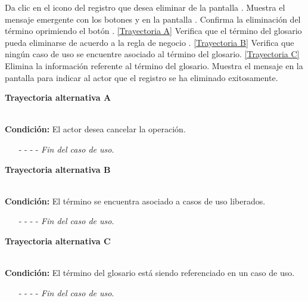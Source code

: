 	\begin{UCtrayectoria}
		\UCpaso[\UCactor] Da clic en el icono \eliminar del registro que desea eliminar de la pantalla .
		\UCpaso[\UCsist] Muestra el mensaje emergente  con los botones  y  en la pantalla .
		\UCpaso[\UCactor] Confirma la eliminación del término oprimiendo el botón . \hyperlink{CU6-3:TAA}{[Trayectoria A]}
		\UCpaso[\UCsist] Verifica que el término del glosario pueda eliminarse de acuerdo a la regla de negocio . \hyperlink{CU6-3:TAB}{[Trayectoria B]}
		\UCpaso[\UCsist] Verifica que ningún caso de uso se encuentre asociado al término del glosario. \hyperlink{CU6-3:TAC}{[Trayectoria C]}
		\UCpaso[\UCsist] Elimina la información referente al término del glosario.
		\UCpaso[\UCsist] Muestra el mensaje  en la pantalla  para indicar al actor que el registro se ha eliminado exitosamente.
	\end{UCtrayectoria}		


\hypertarget{CU6-3:TAA}{\textbf{Trayectoria alternativa A}}\\
\noindent \textbf{Condición:} El actor desea cancelar la operación.
\begin{enumerate}
	\UCpaso[\UCactor] Oprime el botón  de la pantalla emergente.
	\UCpaso[\UCsist] Muestra la pantalla .
	\item[- -] - - {\em {Fin del caso de uso}}.%
\end{enumerate}	
\hypertarget{CU6-3:TAB}{\textbf{Trayectoria alternativa B}}\\
\noindent \textbf{Condición:} El término se encuentra asociado a casos de uso liberados.
\begin{enumerate}
	\UCpaso[\UCsist] Oculta el botón \eliminar del término que esta asociado a casos de uso liberados.
	\item[- -] - - {\em {Fin del caso de uso}}.
\end{enumerate}
\hypertarget{CU6-3:TAC}{\textbf{Trayectoria alternativa C}}\\
\noindent \textbf{Condición:} El término del glosario está siendo referenciado en un caso de uso.
\begin{enumerate}
	\UCpaso[\UCsist] Muestra el mensaje  en la pantalla  en una pantalla emergente con la lista de casos de uso que están referenciando al término del glosario.
	\item[- -] - - {\em {Fin del caso de uso}}.
\end{enumerate}

